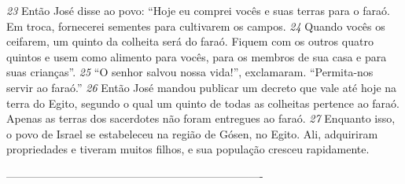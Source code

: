\bigskip
\textit{\tiny 23}
Então José disse ao povo: “Hoje eu comprei vocês e suas terras para o faraó.
Em troca, fornecerei sementes para cultivarem os campos. 
\textit{\tiny 24}
Quando vocês os
ceifarem, um quinto da colheita será do faraó. Fiquem com os outros quatro
quintos e usem como alimento para vocês, para os membros de sua casa e para
suas crianças”.
\textit{\tiny 25}
“O senhor salvou nossa vida!”, exclamaram. “Permita-nos servir ao faraó.”
\textit{\tiny 26}
Então José mandou publicar um decreto que vale até hoje na terra do Egito,
segundo o qual um quinto de todas as colheitas pertence ao faraó. Apenas as
terras dos sacerdotes não foram entregues ao faraó.
\bigskip
\textit{\tiny 27}
Enquanto isso, o povo de Israel se estabeleceu na região de Gósen, no Egito.
Ali, adquiriram propriedades e tiveram muitos filhos, e sua população cresceu
rapidamente. 

----------------------------------------------------------------------

